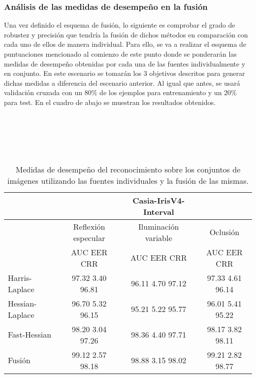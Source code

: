 \subsubsection{Análisis de las medidas de desempeño en la fusión }
Una vez definido el esquema de fusión, lo siguiente es comprobar el grado de robustez y precisión que tendría la fusión de dichos métodos en comparación con cada uno de ellos de manera individual.  Para ello, se va a realizar el esquema de puntuaciones mencionado al comienzo de este punto donde se ponderarán las medidas de desempeño obtenidas por cada una de las fuentes individualmente y en conjunto. En este escenario se tomarán los 3 objetivos descritos para generar dichas medidas a diferencia del escenario anterior. Al igual que antes, se usará validación cruzada con un 80\% de los ejemplos para entrenamiento y un 20\% para test. En el cuadro de abajo se muestran los resultados obtenidos. \\ \\ \\ \\ \\ \\ 


\begin{table}[h]
\begin{center}
\begin{tabular}{@{}lccc@{}}
\toprule
&& Casia-IrisV4-Interval & \\ \hline
&Reflexión especular		&  	Iluminación variable		& Oclusión \\ \hline
&AUC  \phantom{aa} EER  \phantom{aa} CRR &  	AUC  \phantom{aa} EER  \phantom{aa} CRR		& AUC  \phantom{aa} EER  \phantom{aa} CRR \\ \hline
Harris-Laplace& 97.32 \phantom{aa} 3.40  \phantom{aa} 96.81 &  	96.11 \phantom{aa} 4.70  \phantom{aa}97.12		& 97.33 \phantom{aa} 4.61 \phantom{aa} 96.14 \\
Hessian-Laplace& 96.70 \phantom{aa} 5.32  \phantom{aa} 96.15 &  	95.21 \phantom{aa} 5.22 \phantom{aa} 95.77 & 96.01 \phantom{aa} 5.41 \phantom{aa} 95.22 \\
Fast-Hessian& 98.20  \phantom{aa}3.04 \phantom{aa}  97.26 &  	98.36 \phantom{aa} 4.40  \phantom{aa}97.71		& 98.17  \phantom{aa}3.82 \phantom{aa} 98.11 \\
Fusión& 99.12 \phantom{aa} 2.57  \phantom{aa}98.18 &  	98.88  \phantom{aa}3.15 \phantom{aa} 98.02		& 99.21 \phantom{aa} 2.82  \phantom{aa}98.77 \\ \hline

\end{tabular}
\end{center}
\caption{Medidas de desempeño del reconocimiento sobre los conjuntos de imágenes utilizando las fuentes individuales y la fusión de las mismas.}
\label{my_tabla}
\end{table}


